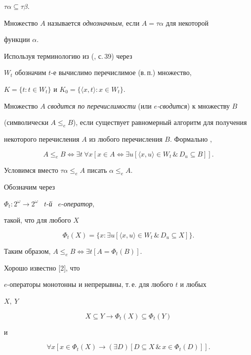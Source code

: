 $\tau\alpha\subseteq\tau\beta$.


Множество $A$ называется {\it однозначным}, если $A=\tau\alpha$ для некоторой


функции $\alpha$.


Используя терминологию из (\cite{r9}, с.\,39) через


$W_t$ обозначим $t$-е вычислимо перечислимое (в.\,п.) множество,


$K=\{t:t\in W_t\}$ и $K_0=\{\langle x,t\rangle:x\in W_t\}$.





Множество $A$ {\it сводится по перечислимости} (или {\it $e$-сводится}) к множеству $B$


(символически $A\leq_eB$), если существует равномерный алгоритм для получения


некоторого перечисления $A$ из любого перечисления $B$. Формально \cite{r10},


$$


A\leq_eB\iff\exists t\ \forall x[x\in A\iff\exists u[\langle x,u\rangle\in W_t\,


\&\,D_u\subseteq B]].


$$


Условимся вместо $\tau\alpha\leq_eA$ писать $\alpha\leq_eA$.


Обозначим через


$\Phi_t:2^{\omega}\to 2^{\omega}$ \ $t$-{\it й} \ $e$-{\it оператор},


такой, что для любого $X$


$$


\Phi_t(X)=\{x:\exists u[\langle x,u\rangle\in W_t\,\&\, D_u\subseteq X]\}.


$$


Таким образом, $A\leq_eB\iff\exists t[A=\Phi_t(B)]$.


Хорошо известно [2], что


$e$-операторы монотонны и непрерывны, т.\,е. для любого $t$ и любых


$X,\ Y$


$$


X\subseteq Y\to\Phi_t(X)\subseteq\Phi_t(Y)


$$


и


$$


\forall x[x\in\Phi_t(X)\to(\exists D)[D\subseteq X\,\&\,x\in\Phi_t(D)]].


$$








